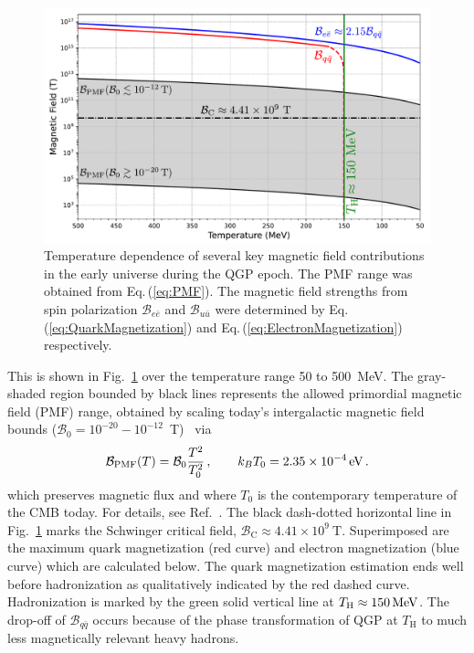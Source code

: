 \documentclass[epjST]{svjour}
\newcommand*{\MeV}{\text{\,MeV}}
\newcommand*{\eV}{\text{\,eV}}
\newcommand{\req}[1]{Eq.\,(\ref{#1})}
\begin{document}
\begin{figure}%
\centerline{
\includegraphics[width=0.90\columnwidth]{Figure_1_v2.pdf}}
\caption{\label{Figure_1}Temperature dependence of several key magnetic field contributions in the early universe during the QGP epoch. {\color{blue}The PMF range was obtained from \req{eq:PMF}. The magnetic field strengths from spin polarization \(\mathcal{B}_{e\bar{e}}\) and \(\mathcal{B}_{u\bar{u}}\) were determined by \req{eq:QuarkMagnetization} and \req{eq:ElectronMagnetization} respectively.}}
\end{figure}

This is shown in Fig.~\ref{Figure_1} over the temperature range 50 to 500~MeV. The gray-shaded region bounded by black lines represents the allowed primordial magnetic field (PMF) range, obtained by scaling today’s intergalactic magnetic field bounds (\(\mathcal{B}_{0} = 10^{-20}-10^{-12}\)~T)~\cite{Planck:2015zrl,Jedamzik:2018itu} {\color{blue}via
\begin{equation}
\label{eq:PMF}
\mathcal{B}_{\rm PMF}(T) = \mathcal{B}_{0}\frac{T^{2}}{T_{0}^{2}}\,,\qquad
k_{B}T_{0} = 2.35\times10^{-4}\eV\,.
\end{equation}
which preserves magnetic flux and where \(T_{0}\) is the contemporary temperature of the CMB today.} For details, see Ref.~\cite{Steinmetz:2023nsc}. The black dash-dotted horizontal line in Fig.~\ref{Figure_1} marks the Schwinger critical field, \(\mathcal{B}_\mathrm{C}\approx4.41\times10^{9}~\mathrm{T}\). Superimposed are the maximum quark magnetization (red curve) and electron magnetization (blue curve) which are calculated below. The quark magnetization estimation ends well before hadronization as qualitatively indicated by the red dashed curve. Hadronization is marked by the green solid vertical line at \(T_\mathrm{H}\approx150\MeV\). The drop-off of \(\mathcal{B}_{q\bar{q}}\) occurs because of the phase transformation of QGP at \(T_\mathrm{H}\) to much less magnetically relevant heavy hadrons.
\end{document}
